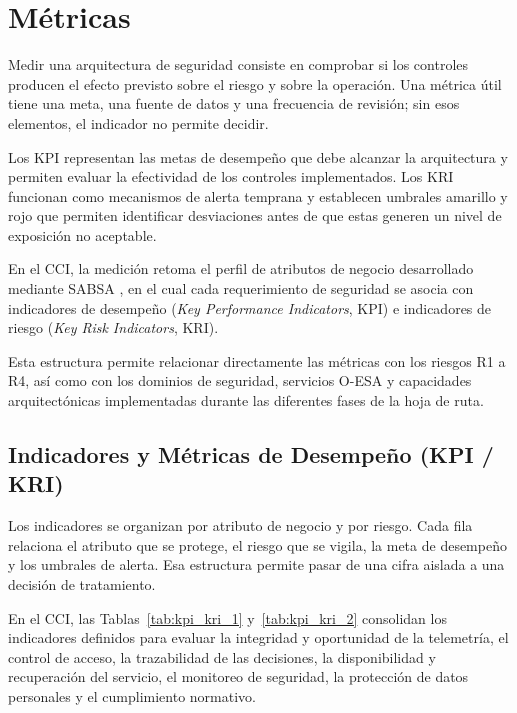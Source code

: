 \section{Métricas}

Medir una arquitectura de seguridad consiste en comprobar si los controles producen el efecto previsto sobre el riesgo y sobre la operación. Una métrica útil tiene una meta, una fuente de datos y una frecuencia de revisión; sin esos elementos, el indicador no permite decidir.

Los KPI representan las metas de desempeño que debe alcanzar la arquitectura y permiten
evaluar la efectividad de los controles implementados. Los KRI funcionan como mecanismos de
alerta temprana y establecen umbrales amarillo y rojo que permiten identificar desviaciones antes
de que estas generen un nivel de exposición no aceptable.

En el CCI, la medición retoma el perfil de atributos de negocio
desarrollado mediante SABSA \parencite{sabsa2005,sabsaCCI2026}, en el cual cada requerimiento de seguridad se asocia
con indicadores de desempeño (\textit{Key Performance Indicators}, KPI) e indicadores de
riesgo (\textit{Key Risk Indicators}, KRI).

Esta estructura permite relacionar directamente las métricas con los riesgos R1 a R4, así como
con los dominios de seguridad, servicios O-ESA \parencite{oesa2011,oesaCCI2026} y capacidades arquitectónicas implementadas
durante las diferentes fases de la hoja de ruta.


\subsection{Indicadores y Métricas de Desempeño (KPI / KRI)}

Los indicadores se organizan por atributo de negocio y por riesgo. Cada fila relaciona el atributo que se protege, el riesgo que se vigila, la meta de desempeño y los umbrales de alerta. Esa estructura permite pasar de una cifra aislada a una decisión de tratamiento.

En el CCI, las Tablas~\ref{tab:kpi_kri_1} y~\ref{tab:kpi_kri_2} consolidan los indicadores
definidos para evaluar la integridad y oportunidad de la telemetría, el control de acceso,
la trazabilidad de las decisiones, la disponibilidad y recuperación del servicio, el monitoreo
de seguridad, la protección de datos personales y el cumplimiento normativo.


